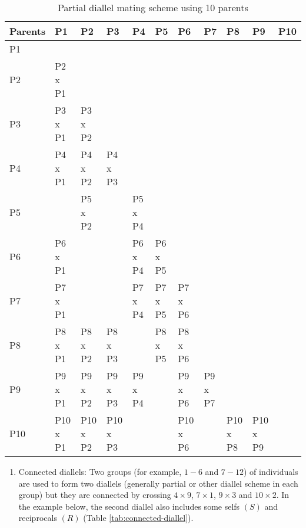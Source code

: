 \documentclass[nofonts,]{tufte-handout}
\providecommand{\tightlist}{%
  \setlength{\itemsep}{0pt}\setlength{\parskip}{0pt}}
\begin{document}
\begingroup\fontsize{8}{10}\selectfont

\begin{longtable}{>{\raggedright\arraybackslash}p{3.5em}>{\raggedright\arraybackslash}p{3.5em}>{\raggedright\arraybackslash}p{3.5em}>{\raggedright\arraybackslash}p{3.5em}>{\raggedright\arraybackslash}p{3.5em}>{\raggedright\arraybackslash}p{3.5em}>{\raggedright\arraybackslash}p{3.5em}>{\raggedright\arraybackslash}p{3.5em}>{\raggedright\arraybackslash}p{3.5em}>{\raggedright\arraybackslash}p{3.5em}>{\raggedright\arraybackslash}p{3.5em}}
\caption{\label{tab:partial-diallel}Partial diallel mating scheme using 10 parents}\\
\toprule
Parents & P1 & P2 & P3 & P4 & P5 & P6 & P7 & P8 & P9 & P10\\
\midrule
\rowcolor{gray!6}  P1 &  &  &  &  &  &  &  &  &  & \\
P2 & P2 x P1 &  &  &  &  &  &  &  &  & \\
\rowcolor{gray!6}  P3 & P3 x P1 & P3 x P2 &  &  &  &  &  &  &  & \\
P4 & P4 x P1 & P4 x P2 & P4 x P3 &  &  &  &  &  &  & \\
\rowcolor{gray!6}  P5 &  & P5 x P2 &  & P5 x P4 &  &  &  &  &  & \\
\addlinespace
P6 & P6 x P1 &  &  & P6 x P4 & P6 x P5 &  &  &  &  & \\
\rowcolor{gray!6}  P7 & P7 x P1 &  &  & P7 x P4 & P7 x P5 & P7 x P6 &  &  &  & \\
P8 & P8 x P1 & P8 x P2 & P8 x P3 &  & P8 x P5 & P8 x P6 &  &  &  & \\
\rowcolor{gray!6}  P9 & P9 x P1 & P9 x P2 & P9 x P3 & P9 x P4 &  & P9 x P6 & P9 x P7 &  &  & \\
P10 & P10 x P1 & P10 x P2 & P10 x P3 &  &  & P10 x P6 &  & P10 x P8 & P10 x P9 & \\
\bottomrule
\end{longtable}
\endgroup{}

\begin{enumerate}
\def\labelenumi{\arabic{enumi}.}
\setcounter{enumi}{3}
\tightlist
\item
  Connected diallels: Two groups (for example, \(1-6\) and \(7-12\)) of
  individuals are used to form two diallels (generally partial or other
  diallel scheme in each group) but they are connected by crossing
  \(4 \times 9\), \(7 \times 1\), \(9 \times 3\) and \(10 \times 2\). In
  the example below, the second diallel also includes some selfs \((S)\)
  and reciprocals \((R)\) (Table \ref{tab:connected-diallel}).
\end{enumerate}
\end{document}
